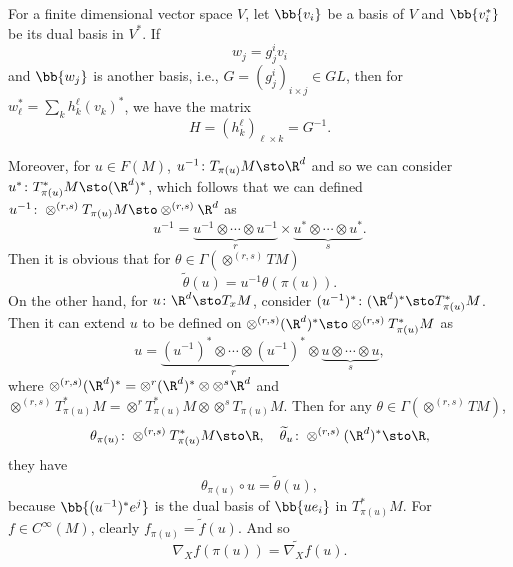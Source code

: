 \begin{rmk}
    For a finite dimensional vector space $V$, let $\bb{v_i}$ be a basis of $V$ and $\bb{v_i^*}$ be its dual basis in $V^*$. If
    \begin{equation*}
        w_j = g_j^i v_i
    \end{equation*}
    and $\bb{w_j}$ is another basis, i.e., $G = (g^i_j)_{i\times j} \in GL$, then for $w_\ell^* = \sum_k h^\ell_k (v_k)^*$, we have the matrix
    \begin{equation*}
        H = (h^\ell_k)_{\ell \times k} = G^{-1}.
    \end{equation*}
\end{rmk}
Moreover, for $u\in F(M)$, $u^{-1} \colon T_{\pi(u)}M \sto \R^d$ and so we can consider $u^* \colon T_{\pi(u)}^*M \sto (\R^d)^*$, which follows that we can defined $u^{-1} \colon \otimes^{(r,s)}T_{\pi(u)}M \sto \otimes^{(r,s)} \R^d$ as
\begin{equation*}
    u^{-1} = \underbrace{u^{-1} \otimes \cdots \otimes u^{-1}}_r \times \underbrace{u^* \otimes \cdots \otimes u^*}_s.
\end{equation*}
Then it is obvious that for $\theta \in \Gamma(\otimes^{(r,s)}TM)$
\begin{equation*}
    \widetilde{\theta}(u) = u^{-1} \theta(\pi(u)).
\end{equation*}
On the other hand, for $u \colon \R^d \sto T_xM$, consider $(u^{-1})^* \colon (\R^d)^* \sto T_{\pi(u)}^*M$. Then it can extend $u$ to be defined on $\otimes^{(r,s)} (\R^d)^* \sto \otimes^{(r,s)}T^*_{\pi(u)}M$ as
\begin{equation*}
    u = \underbrace{(u^{-1})^* \otimes \cdots \otimes (u^{-1})^*}_r \otimes \underbrace{u \otimes \cdots \otimes u}_s,
\end{equation*}
where $\otimes^{(r,s)} (\R^d)^* = \otimes^r (\R^d)^* \otimes \otimes^s \R^d$ and $\otimes^{(r,s)} T_{\pi(u)}^*M = \otimes^r T_{\pi(u)}^*M \otimes \otimes^s T_{\pi(u)}M$. Then for any $\theta \in \Gamma(\otimes^{(r,s)}TM)$,
\begin{equation*}
    \theta_{\pi(u)} \colon \otimes^{(r,s)} T_{\pi(u)}^*M \sto \R,\quad \widetilde{\theta}_u \colon \otimes^{(r,s)} (\R^d)^* \sto \R,
\end{equation*}
they have
\begin{equation*}
    \theta_{\pi(u)} \circ u = \widetilde{\theta}(u),
\end{equation*}
because $\bb{ (u^{-1})^* e^j}$ is the dual basis of $\bb{ue_i}$ in $T^*_{\pi(u)}M$. For $f \in C^{\infty}(M)$, clearly $f_{\pi(u)} = \widetilde{f}(u)$. And so
\begin{equation*}
    \nabla_X f(\pi(u)) = \widetilde{\nabla_X f}(u).
\end{equation*}

